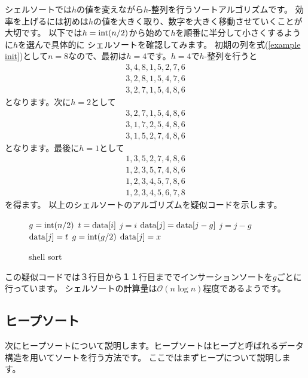 \documentclass[dvipdfmx,pic,eepic,ecltree]{jarticle}
\begin{document}
シェルソートでは$h$の値を変えながら$h$-整列を行うソートアルゴリズムです。
効率を上げるには初めは$h$の値を大きく取り、数字を大きく移動させていくことが大切です。
以下では$h={\rm int}(n/2)$から始めて$h$を順番に半分して小さくするように$h$を選んで具体的に
シェルソートを確認してみます。
初期の列を式(\ref{example init})として$n=8$なので、最初は$h=4$です。$h=4$で$h$-整列を行うと
\begin{eqnarray}
3, 4, 8, 1, 5, 2, 7, 6\\
3, 2, 8, 1, 5, 4, 7, 6\\
3, 2, 7, 1, 5, 4, 8, 6
\end{eqnarray}
となります。次に$h=2$として
\begin{eqnarray}
3, 2, 7, 1, 5, 4, 8, 6\\
3, 1, 7, 2, 5, 4, 8, 6\\
3, 1, 5, 2, 7, 4, 8, 6
\end{eqnarray}
となります。最後に$h=1$として
\begin{eqnarray}
1, 3, 5, 2, 7, 4, 8, 6\\
1, 2, 3, 5, 7, 4, 8, 6\\
1, 2, 3, 4, 5, 7, 8, 6\\
1, 2, 3, 4, 5, 6, 7, 8
\end{eqnarray}
を得ます。
以上のシェルソートのアルゴリズムを疑似コードを示します。
\begin{figure}[H]
\begin{algorithm}[H]
	\caption{shell sort}
	\label{shell sort}
	\begin{algorithmic}[1]
	\STATE $g={\rm int}(n/2)$  
	\STATE $t={\rm data}[i]$
	\STATE $j=i$
	\STATE ${\rm data}[j] = {\rm data}[j-g]$
	\STATE $j = j-g$
	\ENDWHILE
	\STATE ${\rm data}[j] = t$
	\ENDFOR
	\STATE $g = {\rm int}(g/2)$
	\ENDWHILE
	\STATE ${\rm data}[j] = x$
	\end{algorithmic}
\end{algorithm}
\end{figure}
この疑似コードでは３行目から１１行目まででインサーションソートを$g$ごとに行っています。
シェルソートの計算量は$\mathcal{O}(n\log n)$程度であるようです。
\subsection{ヒープソート}
次にヒープソートについて説明します。ヒープソートはヒープと呼ばれるデータ構造を用いてソートを行う方法です。
ここではまずヒープについて説明します。
\end{document}
